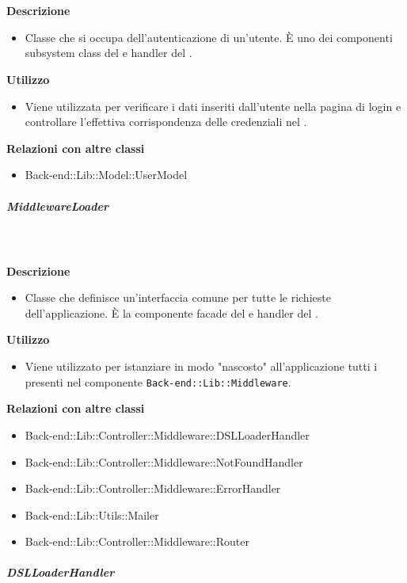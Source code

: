 				\textbf{\\ \\ Descrizione} 
					\begin{itemize}
						\item[] Classe che si occupa dell'autenticazione di un'utente. È uno dei componenti subsystem class del   e handler del  .
					\end{itemize}      
				\textbf{Utilizzo}  
					\begin{itemize}
						\item[] Viene utilizzata per verificare i dati inseriti dall'utente nella pagina di login e controllare l'effettiva corrispondenza delle credenziali nel .
					\end{itemize}
					\textbf{Relazioni con altre classi}
					\begin{itemize}
							\item{Back-end::Lib::Model::UserModel}
					\end{itemize}
			\subparagraph{MiddlewareLoader}
				
				\textbf{\\ \\ Descrizione} 
					\begin{itemize}
						\item[] Classe che definisce un'interfaccia comune per tutte le richieste dell'applicazione. È la componente facade del   e handler del  .
					\end{itemize}      
				\textbf{Utilizzo}  
					\begin{itemize}
						\item[] Viene utilizzato per istanziare in modo "nascosto" all'applicazione tutti i  presenti nel componente \texttt{Back-end::Lib::Middleware}.
					\end{itemize}
					\textbf{Relazioni con altre classi}
					\begin{itemize}
							\item{Back-end::Lib::Controller::Middleware::DSLLoaderHandler}
							\item{Back-end::Lib::Controller::Middleware::NotFoundHandler}
							\item{Back-end::Lib::Controller::Middleware::ErrorHandler}
							\item{Back-end::Lib::Utils::Mailer}
							\item{Back-end::Lib::Controller::Middleware::Router}
					\end{itemize}
			\subparagraph{DSLLoaderHandler}
				
